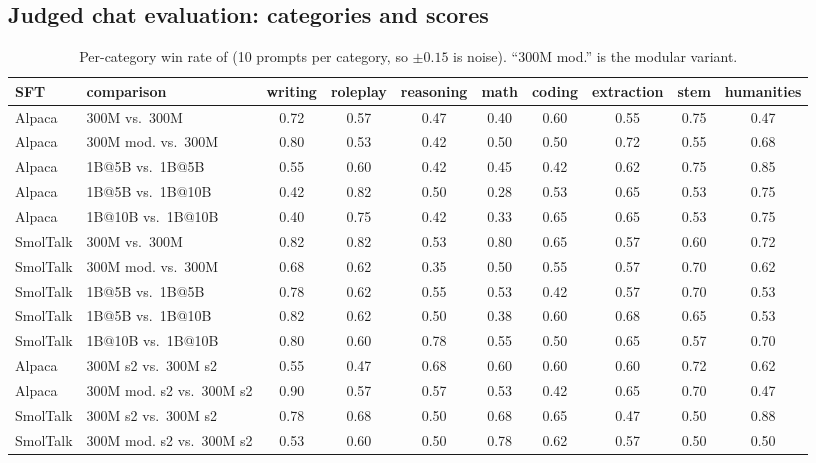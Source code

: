 \subsection{Judged chat evaluation: categories and scores}
\label{app:chat}
\begin{table}[h]\centering\footnotesize\setlength{\tabcolsep}{2.2pt}
\begin{tabular}{llcccccccc}\toprule
SFT & comparison & writing & roleplay & reasoning & math & coding & extraction & stem & humanities \\\midrule
Alpaca & 300M vs.\ 300M & 0.72 & 0.57 & 0.47 & 0.40 & 0.60 & 0.55 & 0.75 & 0.47 \\
Alpaca & 300M mod. vs.\ 300M & 0.80 & 0.53 & 0.42 & 0.50 & 0.50 & 0.72 & 0.55 & 0.68 \\
Alpaca & 1B@5B vs.\ 1B@5B & 0.55 & 0.60 & 0.42 & 0.45 & 0.42 & 0.62 & 0.75 & 0.85 \\
Alpaca & 1B@5B vs.\ 1B@10B & 0.42 & 0.82 & 0.50 & 0.28 & 0.53 & 0.65 & 0.53 & 0.75 \\
Alpaca & 1B@10B vs.\ 1B@10B & 0.40 & 0.75 & 0.42 & 0.33 & 0.65 & 0.65 & 0.53 & 0.75 \\
SmolTalk & 300M vs.\ 300M & 0.82 & 0.82 & 0.53 & 0.80 & 0.65 & 0.57 & 0.60 & 0.72 \\
SmolTalk & 300M mod. vs.\ 300M & 0.68 & 0.62 & 0.35 & 0.50 & 0.55 & 0.57 & 0.70 & 0.62 \\
SmolTalk & 1B@5B vs.\ 1B@5B & 0.78 & 0.62 & 0.55 & 0.53 & 0.42 & 0.57 & 0.70 & 0.53 \\
SmolTalk & 1B@5B vs.\ 1B@10B & 0.82 & 0.62 & 0.50 & 0.38 & 0.60 & 0.68 & 0.65 & 0.53 \\
SmolTalk & 1B@10B vs.\ 1B@10B & 0.80 & 0.60 & 0.78 & 0.55 & 0.50 & 0.65 & 0.57 & 0.70 \\
Alpaca & 300M s2 vs.\ 300M s2 & 0.55 & 0.47 & 0.68 & 0.60 & 0.60 & 0.60 & 0.72 & 0.62 \\
Alpaca & 300M mod. s2 vs.\ 300M s2 & 0.90 & 0.57 & 0.57 & 0.53 & 0.42 & 0.65 & 0.70 & 0.47 \\
SmolTalk & 300M s2 vs.\ 300M s2 & 0.78 & 0.68 & 0.50 & 0.68 & 0.65 & 0.47 & 0.50 & 0.88 \\
SmolTalk & 300M mod. s2 vs.\ 300M s2 & 0.53 & 0.60 & 0.50 & 0.78 & 0.62 & 0.57 & 0.50 & 0.50 \\
\bottomrule\end{tabular}
\caption{Per-category win rate of \dagf{} (10 prompts per category, so $\pm 0.15$ is noise). ``300M mod.'' is the modular variant.}
\label{tab:chat_cats}\end{table}
